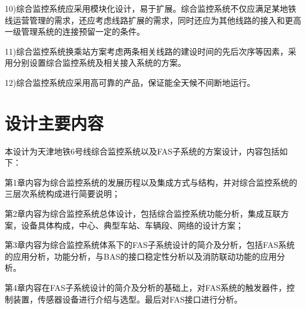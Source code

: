 10)综合监控系统应采用模块化设计，易于扩展。综合监控系统不仅应满足某地铁线运营管理的需求，还应考虑线路扩展的需求，同时还应为其他线路的接入和更高一级管理系统的连接预留一定的条件。

11)综合监控系统换乘站方案考虑两条相关线路的建设时间的先后次序等因素，采用分别设置综合监控系统及相关接入系统的方案。

12)综合监控系统应采用高可靠的产品，保证能全天候不间断地运行。

\section{设计主要内容}

本设计为天津地铁6号线综合监控系统以及FAS子系统的方案设计，内容包括如下：

第1章内容为综合监控系统的发展历程以及集成方式与结构，并对综合监控系统的三层次系统构成进行简要说明；

第2章内容为综合监控系统总体设计，包括综合监控系统功能分析，集成互联方案，设备具体构成，中心、典型车站、车辆段、网络的设计方案；

第3章内容为综合监控系统体系下的FAS子系统设计的简介及分析，包括FAS系统的应用分析，功能分析，与BAS的接口稳定性分析以及消防联动功能的应用分析。

第4章内容在FAS子系统设计的简介及分析的基础上，对FAS系统的触发器件，控制装置，传感器设备进行介绍与选型。最后对FAS接口进行分析。
